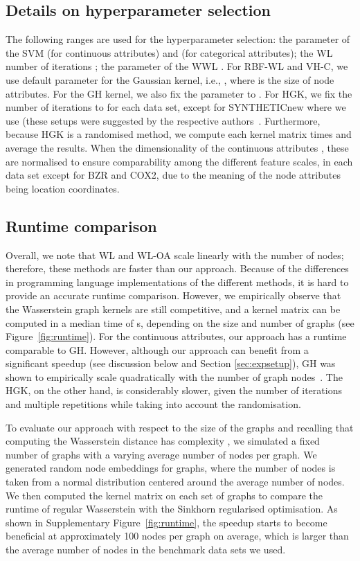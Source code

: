 \documentclass{article}
\begin{document}
\subsection{Details on hyperparameter selection}
\label{app:hypersel}
The following ranges are used for the hyperparameter selection: the parameter of the SVM  (for continuous attributes) and  (for categorical attributes); the WL number of iterations ; the  parameter of the WWL . For RBF-WL and VH-C, we use default  parameter for the Gaussian kernel, i.e., , where  is the size of node attributes. 
For the GH kernel, we also fix the  parameter to . For HGK, we fix the number of iterations to  for each data set, except for SYNTHETICnew where we use  (these setups were suggested by the respective authors~\citep{morris2016faster,feragen2013scalable}. Furthermore, because HGK is a randomised method, we compute each kernel matrix  times and average the results. 
When the dimensionality of the continuous attributes , these are normalised to ensure comparability among the different feature scales, in each data set except for BZR and COX2, due to the meaning of the node attributes being location coordinates. 


\subsection{Runtime comparison}
\label{app:runtime}

Overall, we note that WL and WL-OA scale linearly with the number of nodes; therefore, these methods are faster than our approach. Because of the differences in programming language implementations of the different methods, it is hard to provide an accurate runtime comparison. However, we empirically observe that the Wasserstein graph kernels are still competitive, and a kernel matrix can be computed in a median time of  s, depending on the size and number of graphs (see Figure~\ref{fig:runtime}). For the continuous attributes, our approach has a runtime comparable to GH. However, although our approach can benefit from a significant speedup (see discussion below and Section \ref{sec:expsetup}), GH was shown to empirically scale quadratically with the number of graph nodes~\citep{feragen2013scalable}. The HGK, on the other hand, is considerably slower, given the number of iterations and multiple repetitions while taking into account the randomisation.

To evaluate our approach with respect to the size of the graphs and recalling that computing the Wasserstein distance has complexity , we simulated a fixed number of graphs with a varying average number of nodes per graph. We generated random node embeddings for  graphs, where the number of nodes is taken from a normal distribution centered around the average number of nodes. We then computed the kernel matrix on each set of graphs to compare the runtime of regular Wasserstein with the Sinkhorn regularised optimisation. As shown in Supplementary Figure~\ref{fig:runtime}, the speedup starts to become beneficial at approximately 100 nodes per graph on average, which is larger than the average number of nodes in the benchmark data sets we used.
\end{document}
